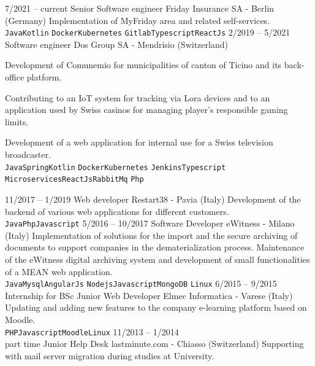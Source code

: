 \documentclass[9pt]{developercv} %
\begin{document}
\begin{entrylist}
    \entry
		{7/2021 -- current}
		{Senior Software engineer}
		{Friday Insurance SA - Berlin (Germany)}
		{Implementation of MyFriday area and related self-services.\\
        \texttt{Java}\slashsep\texttt{Kotlin}
        \slashsep\texttt{Docker}\slashsep\texttt{Kubernetes}
        \slashsep\texttt{Gitlab}\slashsep\texttt{Typescript}\slashsep\texttt{ReactJs}}
	\entry
		{2/2019 -- 5/2021}
		{Software engineer}
		{Dos Group SA - Mendrisio (Switzerland)}
		{Development of Comunemio for municipalities of canton of Ticino and its back-office platform.

        Contributing to an IoT system for tracking via Lora devices and to an application used by Swiss casinos for managing player's responsible gaming limits.

        Development of a web application for internal use for a Swiss television broadcaster.\\
        \texttt{Java}\slashsep\texttt{Spring}\slashsep\texttt{Kotlin}
        \slashsep\texttt{Docker}\slashsep\texttt{Kubernetes}
        \slashsep\texttt{Jenkins}\slashsep\texttt{Typescript}\\
        \texttt{Microservices}\slashsep\texttt{ReactJs}\slashsep\texttt{RabbitMq}
        \slashsep\texttt{Php}}
	\entry
		{11/2017 -- 1/2019}
		{Web developer}
		{Restart38 - Pavia (Italy)}
		{Development of the backend of various web applications for different customers.
		\\ \texttt{Java}\slashsep\texttt{Php}\slashsep\texttt{Javascript}}
	\entry
		{5/2016 -- 10/2017}
		{Software Developer}
		{eWitness - Milano (Italy)}
		{Implementation of solutions for the import and the secure archiving of documents to support companies in the dematerialization process.
        Maintenance of the eWitness digital archiving system and development of small functionalities of a MEAN web application.\\
        \texttt{Java}\slashsep\texttt{Mysql}\slashsep\texttt{AngularJs}
        \slashsep\texttt{Nodejs}\slashsep\texttt{Javascript}\slashsep\texttt{MongoDB}
        \slashsep\texttt{Linux}}
	\entry
		{6/2015 -- 9/2015\\\footnotesize{Internship for BSc}}
		{Junior Web Developer}
		{Elmec Informatica - Varese (Italy)}
		{Updating and adding new features to the company e-learning platform based on Moodle.\\
        \texttt{PHP}\slashsep\texttt{Javascript}\slashsep\texttt{Moodle}\slashsep\texttt{Linux}}
	\entry
		{11/2013 -- 1/2014\\\footnotesize{part time}}
		{Junior Help Desk}
		{lastminute.com - Chiasso (Switzerland)}
		{Supporting with mail server migration during studies at University.}
\end{entrylist}
\end{document}

